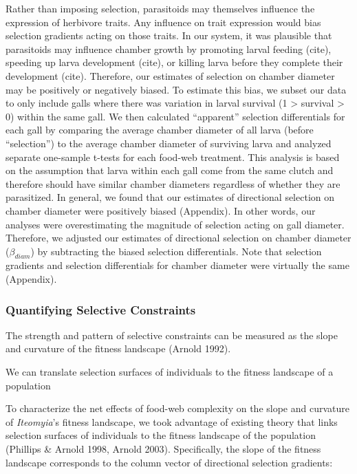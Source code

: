 \documentclass[]{elsarticle} %
\begin{document}
Rather than imposing selection, parasitoids may themselves influence the
expression of herbivore traits. Any influence on trait expression would
bias selection gradients acting on those traits. In our system, it was
plausible that parasitoids may influence chamber growth by promoting
larval feeding (cite), speeding up larva development (cite), or killing
larva before they complete their development (cite). Therefore, our
estimates of selection on chamber diameter may be positively or
negatively biased. To estimate this bias, we subset our data to only
include galls where there was variation in larval survival (1
\textgreater{} survival \textgreater{} 0) within the same gall. We then
calculated ``apparent'' selection differentials for each gall by
comparing the average chamber diameter of all larva (before
``selection'') to the average chamber diameter of surviving larva and
analyzed separate one-sample t-tests for each food-web treatment. This
analysis is based on the assumption that larva within each gall come
from the same clutch and therefore should have similar chamber diameters
regardless of whether they are parasitized. In general, we found that
our estimates of directional selection on chamber diameter were
positively biased (Appendix). In other words, our analyses were
overestimating the magnitude of selection acting on gall diameter.
Therefore, we adjusted our estimates of directional selection on chamber
diameter (\(\beta_{diam}\)) by subtracting the biased selection
differentials. Note that selection gradients and selection differentials
for chamber diameter were virtually the same (Appendix).

\subsubsection{Quantifying Selective
Constraints}\label{quantifying-selective-constraints}

The strength and pattern of selective constraints can be measured as the
slope and curvature of the fitness landscape (Arnold 1992).

We can translate selection surfaces of individuals to the fitness
landscape of a population

To characterize the net effects of food-web complexity on the slope and
curvature of \emph{Iteomyia}'s fitness landscape, we took advantage of
existing theory that links selection surfaces of individuals to the
fitness landscape of the population (Phillips \& Arnold 1998, Arnold
2003). Specifically, the slope of the fitness landscape corresponds to
the column vector of directional selection gradients:
\end{document}
